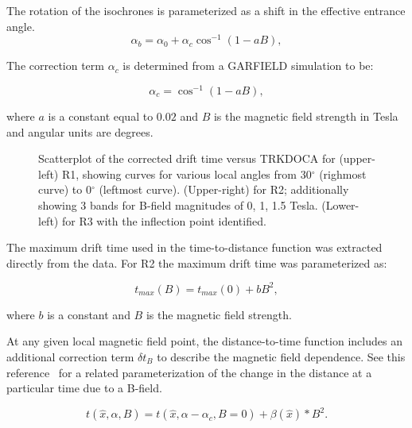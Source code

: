 The rotation of the isochrones is parameterized as a shift in the effective
entrance angle.  
\begin{equation} 
\label{eq-bcorrn-to-ang}
\alpha_b = \alpha_0 + \alpha_c \cos^{-1}(1 - a B), 
\end{equation}

The correction term $\alpha_c$ is determined from a 
GARFIELD simulation to be:

\begin{equation} 
\label{eq-bang}
\alpha_c = \cos^{-1}(1 - a B), 
\end{equation}

\noindent
where $a$ is a constant equal to $0.02$ and $B$ is the magnetic field strength in Tesla and angular
units are degrees.

\begin{figure}[htb]
\vspace{15.cm} 
\caption{\small{Scatterplot of the corrected drift time versus TRKDOCA for 
(upper-left) R1, showing curves for various local angles from 30$^{\circ}$
(righmost curve) to 0$^{\circ}$ (leftmost curve).  (Upper-right) for R2; 
additionally showing 3 bands for B-field magnitudes of 0, 1, 1.5 Tesla.
(Lower-left) for R3 with the inflection point identified.}}
\label{xvst}
\end{figure}


The maximum drift time used in the time-to-distance function was extracted 
directly from the data.  For R2 the maximum drift time was parameterized as:

\begin{equation} 
\label{eq-bmax}
t_{max}(B) = t_{max}(0) + b B^2,
\end{equation}

\noindent
where $b$ is a constant and $B$ is the magnetic field strength.

At any given local magnetic field point, the distance-to-time function 
includes an additional correction term $\delta t_B$ to describe 
the magnetic field dependence.  See this reference~\cite{qin96} for a related
parameterization of the change in the distance at a particular time due to a
B-field. 

\begin{equation}
\label{XTB}
t(\hat{x},\alpha,B) = t(\hat{x},\alpha-\alpha_c, B=0) +  \beta(\hat{x})*B^2.
\end{equation}

